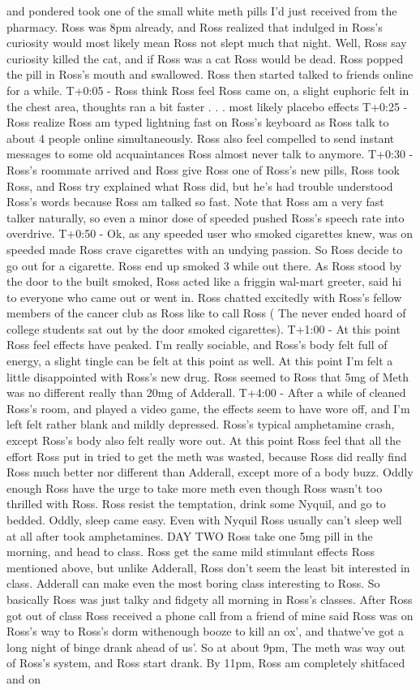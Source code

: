 \documentclass[12pt]{book}
\begin{document}
and pondered took one of the small white meth pills I'd just received from the pharmacy. Ross was 8pm already, and Ross realized that indulged in Ross's curiosity would most likely mean Ross not slept much that night. Well, Ross say curiosity killed the cat, and if Ross was a cat Ross would be dead. Ross popped the pill in Ross's mouth and swallowed. Ross then started talked to friends online for a while. T+0:05 - Ross think Ross feel Ross came on, a slight euphoric felt in the chest area, thoughts ran a bit faster . . .  most likely placebo effects T+0:25 - Ross realize Ross am typed lightning fast on Ross's keyboard as Ross talk to about 4 people online simultaneously. Ross also feel compelled to send instant messages to some old acquaintances Ross almost never talk to anymore. T+0:30 - Ross's roommate arrived and Ross give Ross one of Ross's new pills, Ross took Ross, and Ross try explained what Ross did, but he's had trouble understood Ross's words because Ross am talked so fast. Note that Ross am a very fast talker naturally, so even a minor dose of speeded pushed Ross's speech rate into overdrive. T+0:50 - Ok, as any speeded user who smoked cigarettes knew, was on speeded made Ross crave cigarettes with an undying passion. So Ross decide to go out for a cigarette. Ross end up smoked 3 while out there. As Ross stood by the door to the built smoked, Ross acted like a friggin wal-mart greeter, said hi to everyone who came out or went in. Ross chatted excitedly with Ross's fellow members of the cancer club as Ross like to call Ross ( The never ended hoard of college students sat out by the door smoked cigarettes). T+1:00 - At this point Ross feel effects have peaked. I'm really sociable, and Ross's body felt full of energy, a slight tingle can be felt at this point as well. At this point I'm felt a little disappointed with Ross's new drug. Ross seemed to Ross that 5mg of Meth was no different really than 20mg of Adderall. T+4:00 - After a while of cleaned Ross's room, and played a video game, the effects seem to have wore off, and I'm left felt rather blank and mildly depressed. Ross's typical amphetamine crash, except Ross's body also felt really wore out. At this point Ross feel that all the effort Ross put in tried to get the meth was wasted, because Ross did really find Ross much better nor different than Adderall, except more of a body buzz. Oddly enough Ross have the urge to take more meth even though Ross wasn't too thrilled with Ross. Ross resist the temptation, drink some Nyquil, and go to bedded. Oddly, sleep came easy. Even with Nyquil Ross usually can't sleep well at all after took amphetamines. DAY TWO Ross take one 5mg pill in the morning, and head to class. Ross get the same mild stimulant effects Ross mentioned above, but unlike Adderall, Ross don't seem the least bit interested in class. Adderall can make even the most boring class interesting to Ross. So basically Ross was just talky and fidgety all morning in Ross's classes. After Ross got out of class Ross received a phone call from a friend of mine said Ross was on Ross's way to Ross's dorm withenough booze to kill an ox', and thatwe've got a long night of binge drank ahead of us'. So at about 9pm, The meth was way out of Ross's system, and Ross start drank. By 11pm, Ross am completely shitfaced and on 
\end{document}
